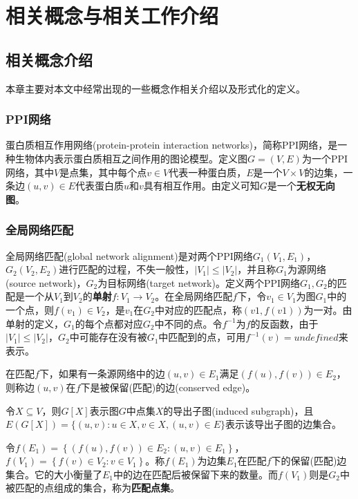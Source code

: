 \chapter{相关概念与相关工作介绍}

\section{相关概念介绍}
本章主要对本文中经常出现的一些概念作相关介绍以及形式化的定义。

\subsection{PPI网络}
蛋白质相互作用网络(protein-protein interaction networks)，简称PPI网络，是一种生物体内表示蛋白质相互之间作用的图论模型。定义图$G=(V,E)$为一个PPI网络，其中$V$是点集，其中每个点$v\in V$代表一种蛋白质，$E$是一个$V×V$的边集，一条边$(u,v)\in E$代表蛋白质$u$和$v$具有相互作用。由定义可知$G$是一个\textbf{无权无向图}。
\subsection{全局网络匹配}
全局网络匹配(global network alignment)是对两个PPI网络$G_1(V_1,E_1)$，$G_2(V_2,E_2)$进行匹配的过程，不失一般性，$|V_1|\leq|V_2|$，并且称$G_1$为源网络(source network)，$G_2$为目标网络(target network)。定义两个PPI网络$G_1,G_2$的匹配是一个从$V_1$到$V_2$的\textbf{单射}$f:V_1\rightarrow V_2$。在全局网络匹配$f$下，令$v_1\in V_1$为图$G_1$中的一个点，则$f(v_1)\in V_2$，是$v_1$在$G_2$中对应的匹配点，称$(v1,f(v1))$为一对。由单射的定义，$G_1$的每个点都对应$G_2$中不同的点。令$f^{-1}$为$f$的反函数，由于$|V_1|\leq|V_2|$，$G_2$中可能存在没有被$G_1$中匹配到的点，可用$f^{-1}(v)=undefined$来表示。

在匹配$f$下，如果有一条源网络中的边$(u,v)\in E_1$满足$(f(u),f(v))\in E_2$，则称边$(u,v)$在$f$下是被保留(匹配)的边(conserved edge)。

令$X\subseteq V$，则$G[X]$表示图$G$中点集$X$的导出子图(induced subgraph)，且$E(G[X])=\{(u,v):u\in X,v\in X,(u,v)\in E\}$表示该导出子图的边集合。

令$f(E_1)=\left \{(f(u),f(v))\in E_2:(u,v)\in E_1\right \}$，$f(V_1)=\left\{f(v)\in V_2:v\in V_1\right\}$。称$f(E_1)$为边集$E_1$在匹配$f$下的保留(匹配)边集合。它的大小衡量了$E_1$中的边在匹配后被保留下来的数量。而$f(V_1)$则是$G_2$中被匹配的点组成的集合，称为\textbf{匹配点集}。


